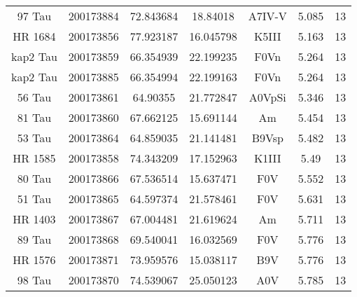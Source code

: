 \begin{table*}
\begin{tabular}{ccccccc}
97 Tau & 200173884 & 72.843684 & 18.84018 & A7IV-V & 5.085 & 13 \\
HR 1684 & 200173856 & 77.923187 & 16.045798 & K5III & 5.163 & 13 \\
kap2 Tau & 200173859 & 66.354939 & 22.199235 & F0Vn & 5.264 & 13 \\
kap2 Tau & 200173885 & 66.354994 & 22.199163 & F0Vn & 5.264 & 13 \\
56 Tau & 200173861 & 64.90355 & 21.772847 & A0VpSi & 5.346 & 13 \\
81 Tau & 200173860 & 67.662125 & 15.691144 & Am & 5.454 & 13 \\
53 Tau & 200173864 & 64.859035 & 21.141481 & B9Vsp & 5.482 & 13 \\
HR 1585 & 200173858 & 74.343209 & 17.152963 & K1III & 5.49 & 13 \\
80 Tau & 200173866 & 67.536514 & 15.637471 & F0V & 5.552 & 13 \\
51 Tau & 200173865 & 64.597374 & 21.578461 & F0V & 5.631 & 13 \\
HR 1403 & 200173867 & 67.004481 & 21.619624 & Am & 5.711 & 13 \\
89 Tau & 200173868 & 69.540041 & 16.032569 & F0V & 5.776 & 13 \\
HR 1576 & 200173871 & 73.959576 & 15.038117 & B9V & 5.776 & 13 \\
98 Tau & 200173870 & 74.539067 & 25.050123 & A0V & 5.785 & 13 \\
\hline
\end{tabular}
\end{table*}
